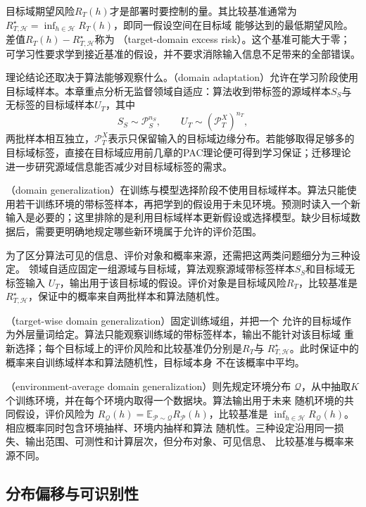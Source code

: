 目标域期望风险$R_T(h)$才是部署时要控制的量。其比较基准通常为
$R_{T,\mathcal H}^{\star}=\inf_{h\in\mathcal H}R_T(h)$，即同一假设空间在目标域
能够达到的最低期望风险。差值$R_T(h)-R_{T,\mathcal H}^{\star}$称为
（target-domain excess risk）。这个基准可能大于零；
可学习性要求学到接近基准的假设，并不要求消除输入信息不足带来的全部错误。

理论结论还取决于算法能够观察什么。（domain adaptation）允许在学习阶段使用目标域样本。本章重点分析无监督领域自适应：算法收到带标签的源域样本$S_S$与无标签的目标域样本$U_T$，其中
\[
 S_S\sim\mathcal P_S^{n_S},\qquad
 U_T\sim(\mathcal P_T^X)^{n_T},
\]
两批样本相互独立，$\mathcal P_T^X$表示只保留输入的目标域边缘分布。若能够取得足够多的目标域标签，直接在目标域应用前几章的PAC理论便可得到学习保证；迁移理论进一步研究源域信息能否减少对目标域标签的需求。

（domain generalization）在训练与模型选择阶段不使用目标域样本。算法只能使用若干训练环境的带标签样本，再把学到的假设用于未见环境。预测时读入一个新输入是必要的；这里排除的是利用目标域样本更新假设或选择模型。缺少目标域数据后，需要更明确地规定哪些新环境属于允许的评价范围。

为了区分算法可见的信息、评价对象和概率来源，还需把这两类问题细分为三种设定。
领域自适应固定一组源域与目标域，算法观察源域带标签样本$S_S$和目标域无标签输入
$U_T$，输出用于该目标域的假设。评价对象是目标域风险$R_T$，比较基准是
$R_{T,\mathcal H}^{\star}$，保证中的概率来自两批样本和算法随机性。

（target-wise domain generalization）固定训练域组，并把一个
允许的目标域作为外层量词给定。算法只能观察训练域的带标签样本，输出不能针对该目标域
重新选择；每个目标域上的评价风险和比较基准仍分别是$R_T$与
$R_{T,\mathcal H}^{\star}$。此时保证中的概率来自训练域样本和算法随机性，目标域本身
不在该概率中平均。

（environment-average domain generalization）则先规定环境分布
$\mathcal Q$，从中抽取$K$个训练环境，并在每个环境内取得一个数据块。算法输出用于未来
随机环境的共同假设，评价风险为
$R_{\mathcal Q}(h)=\mathbb E_{\mathcal P\sim\mathcal Q}R_{\mathcal P}(h)$，比较基准是
$\inf_{h\in\mathcal H}R_{\mathcal Q}(h)$。相应概率同时包含环境抽样、环境内抽样和算法
随机性。三种设定沿用同一损失、输出范围、可测性和计算层次，但分布对象、可见信息、
比较基准与概率来源不同。

\subsection{分布偏移与可识别性}
\label{sec:distribution-shift}

